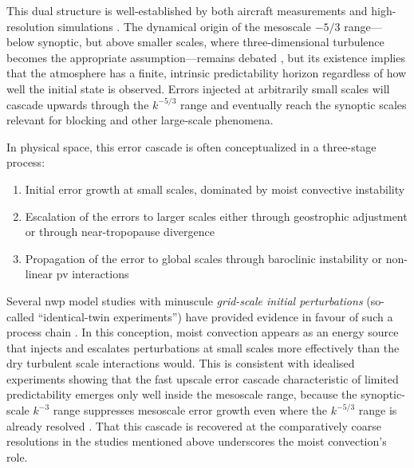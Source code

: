 This dual structure is well-established by both aircraft measurements
\parencite{nastromKineticEnergySpectrum1984, lindborgCanAtmosphericKinetic1999}
and high-resolution simulations
\parencite{skamarockAtmosphericKineticEnergy2014,
    liExploringDifferencesAtmospheric2025}. The dynamical origin of the mesoscale
$-5/3$ range---below synoptic, but above smaller scales, where
three-dimensional turbulence becomes the appropriate assumption---remains
debated \parencite{lindborgEnergyCascadeStrongly2006,gageEvidenceForK51979,
    dewanSaturatedcascadeSimilitudeTheory1997}, but its existence implies that the
atmosphere has a finite, intrinsic predictability horizon regardless of how
well the initial state is observed. Errors injected at arbitrarily small scales
will cascade upwards through the $k^{-5/3}$ range and eventually reach the
synoptic scales relevant for blocking and other large-scale phenomena.

In physical space, this error cascade is often conceptualized in a three-stage
process:
\begin{enumerate}
    \item Initial error growth at small scales, dominated by moist convective
          instability
    \item Escalation of the errors to larger scales either through geostrophic
          adjustment \parencite{zhangMesoscalePredictabilityMoist2007,
              bierdelTheoreticalAspectsUpscale2018} or through near-tropopause
          divergence \parencite{baumgartQuantitativeViewProcesses2019}
    \item Propagation of the error to global scales through baroclinic
          instability \parencite{zhangMesoscalePredictabilityMoist2007} or
          non-linear \gls{pv} interactions
          \parencite{baumgartQuantitativeViewProcesses2019}
\end{enumerate}
Several \gls{nwp} model studies with minuscule
\emph{grid-scale initial perturbations}
(so-called \enquote{identical-twin experiments}) have provided evidence
in favour of such a process chain
\parencite{judtInsightsAtmosphericPredictability2018,
    selzEstimatingIntrinsicLimit2019,
    lloverasExploringIntrinsicPredictability2025}. In this conception, moist
convection appears as an energy source that injects and escalates perturbations
at small scales more effectively than the dry turbulent scale interactions
would. This is consistent with idealised experiments showing
that the fast upscale error cascade characteristic of limited
predictability emerges only well inside the mesoscale range, because the
synoptic-scale $k^{-3}$ range suppresses mesoscale
error growth even where the $k^{-5/3}$ range is already resolved
\parencite{leungImpactMesoscaleRange2020}. That this cascade is recovered
at the comparatively coarse resolutions in the studies mentioned above
underscores the moist convection's role.

